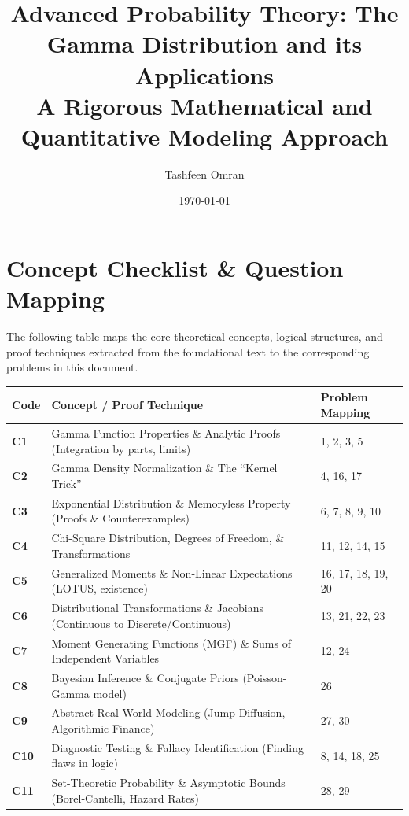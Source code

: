 \documentclass[11pt, a4paper]{article}
\theoremstyle{definition}
\theoremstyle{remark}
\begin{document}
\title{\textbf{Advanced Probability Theory: The Gamma Distribution and its Applications \\ \large A Rigorous Mathematical and Quantitative Modeling Approach}}
\author{Tashfeen Omran}
\date{\today}

\maketitle
\tableofcontents
\newpage

\section{Concept Checklist \& Question Mapping}

The following table maps the core theoretical concepts, logical structures, and proof techniques extracted from the foundational text to the corresponding problems in this document.

\vspace{1em}
\noindent
\renewcommand{\arraystretch}{1.5}
\begin{tabularx}{\textwidth}{l X l}
\toprule
\textbf{Code} & \textbf{Concept / Proof Technique} & \textbf{Problem Mapping} \\
\midrule
\textbf{C1} & Gamma Function Properties \& Analytic Proofs (Integration by parts, limits) & 1, 2, 3, 5 \\
\textbf{C2} & Gamma Density Normalization \& The ``Kernel Trick'' & 4, 16, 17 \\
\textbf{C3} & Exponential Distribution \& Memoryless Property (Proofs \& Counterexamples) & 6, 7, 8, 9, 10 \\
\textbf{C4} & Chi-Square Distribution, Degrees of Freedom, \& Transformations & 11, 12, 14, 15 \\
\textbf{C5} & Generalized Moments \& Non-Linear Expectations (LOTUS, existence) & 16, 17, 18, 19, 20 \\
\textbf{C6} & Distributional Transformations \& Jacobians (Continuous to Discrete/Continuous) & 13, 21, 22, 23 \\
\textbf{C7} & Moment Generating Functions (MGF) \& Sums of Independent Variables & 12, 24 \\
\textbf{C8} & Bayesian Inference \& Conjugate Priors (Poisson-Gamma model) & 26 \\
\textbf{C9} & Abstract Real-World Modeling (Jump-Diffusion, Algorithmic Finance) & 27, 30 \\
\textbf{C10} & Diagnostic Testing \& Fallacy Identification (Finding flaws in logic) & 8, 14, 18, 25 \\
\textbf{C11} & Set-Theoretic Probability \& Asymptotic Bounds (Borel-Cantelli, Hazard Rates) & 28, 29 \\
\bottomrule
\end{tabularx}
\vspace{1em}
\end{document}
